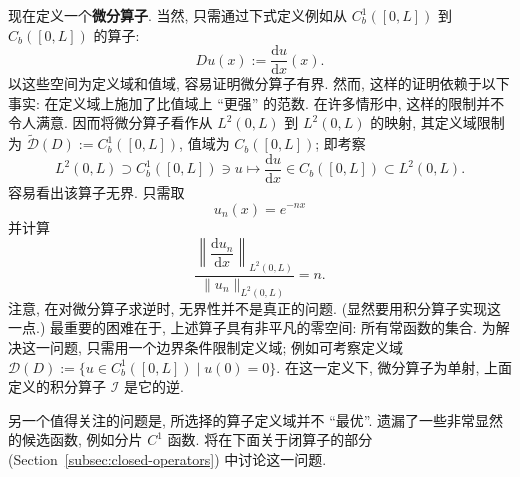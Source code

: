 \begin{Example}
\label{ex:differentiation-operator-domain-and-unboundedness}
现在定义一个\textbf{微分算子}. 当然, 只需通过下式定义例如从 $C_b^1([0,L])$ 到 $C_b([0,L])$ 的算子:
\begin{equation}\label{eq:differentiation-operator-pointwise-definition}
Du(x):=\dfrac{\mathrm{d}u}{\mathrm{d}x}(x).
\end{equation}
以这些空间为定义域和值域, 容易证明微分算子有界. 然而, 这样的证明依赖于以下事实: 在定义域上施加了比值域上 ``更强'' 的范数. 在许多情形中, 这样的限制并不令人满意. 因而将微分算子看作从 $L^2(0,L)$ 到 $L^2(0,L)$ 的映射, 其定义域限制为 $\widetilde{\mathcal{D}}(D):=C_b^1([0,L])$, 值域为 $C_b([0,L])$; 即考察\[L^2(0,L)\supset C_b^1([0,L])\ni u\mapsto\dfrac{\mathrm{d}u}{\mathrm{d}x}\in C_b([0,L])\subset L^2(0,L).\]容易看出该算子无界. 只需取
\begin{equation}\label{eq:unbounded-differentiation-exponential-sequence}
u_n(x)=e^{-nx}
\end{equation}
并计算
\begin{equation}\label{eq:unbounded-differentiation-norm-ratio}
\dfrac{\left\|\dfrac{\mathrm{d}u_n}{\mathrm{d}x}\right\|_{L^2(0,L)}}{\|u_n\|_{L^2(0,L)}}=n.
\end{equation}
注意, 在对微分算子求逆时, 无界性并不是真正的问题. (显然要用积分算子实现这一点.) 最重要的困难在于, 上述算子具有非平凡的零空间: 所有常函数的集合. 为解决这一问题, 只需用一个边界条件限制定义域; 例如可考察定义域 $\mathcal{D}(D):=\{u\in C_b^1([0,L])\mid u(0)=0\}$. 在这一定义下, 微分算子为单射, 上面定义的积分算子 $\mathcal{I}$ 是它的逆.

另一个值得关注的问题是, 所选择的算子定义域并不 ``最优''. 遗漏了一些非常显然的候选函数, 例如分片 $C^1$ 函数. 将在下面关于闭算子的部分 (Section~\ref{subsec:closed-operators}) 中讨论这一问题.
\end{Example}
